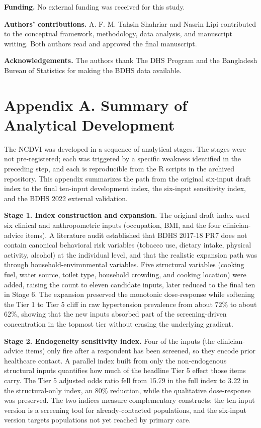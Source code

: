 \documentclass[
  12pt,
  a4paper]{article}
\begin{document}
\textbf{Funding.} No external funding was received for this study.

\textbf{Authors' contributions.} A. F. M. Tahsin Shahriar and Nasrin Lipi contributed to the conceptual framework, methodology, data analysis, and manuscript writing. Both authors read and approved the final manuscript.

\textbf{Acknowledgements.} The authors thank The DHS Program and the Bangladesh Bureau of Statistics for making the BDHS data available.



\newpage
\appendix

\section*{Appendix A. Summary of Analytical Development}\label{appendix-a.-summary-of-analytical-development}

The NCDVI was developed in a sequence of analytical stages. The stages were not pre-registered; each was triggered by a specific weakness identified in the preceding step, and each is reproducible from the R scripts in the archived repository. This appendix summarizes the path from the original six-input draft index to the final ten-input development index, the six-input sensitivity index, and the BDHS 2022 external validation.

\textbf{Stage 1. Index construction and expansion.} The original draft index used six clinical and anthropometric inputs (occupation, BMI, and the four clinician-advice items). A literature audit established that BDHS 2017-18 PR7 does not contain canonical behavioral risk variables (tobacco use, dietary intake, physical activity, alcohol) at the individual level, and that the realistic expansion path was through household-environmental variables. Five structural variables (cooking fuel, water source, toilet type, household crowding, and cooking location) were added, raising the count to eleven candidate inputs, later reduced to the final ten in Stage 6. The expansion preserved the monotonic dose-response while softening the Tier 1 to Tier 5 cliff in raw hypertension prevalence from about 72\% to about 62\%, showing that the new inputs absorbed part of the screening-driven concentration in the topmost tier without erasing the underlying gradient.

\textbf{Stage 2. Endogeneity sensitivity index.} Four of the inputs (the clinician-advice items) only fire after a respondent has been screened, so they encode prior healthcare contact. A parallel index built from only the non-endogenous structural inputs quantifies how much of the headline Tier 5 effect those items carry. The Tier 5 adjusted odds ratio fell from 15.79 in the full index to 3.22 in the structural-only index, an 80\% reduction, while the qualitative dose-response was preserved. The two indices measure complementary constructs: the ten-input version is a screening tool for already-contacted populations, and the six-input version targets populations not yet reached by primary care.
\end{document}
